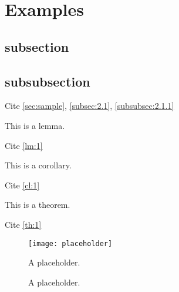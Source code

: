 

\newpage

\section{Examples}
\label{sec:sample}

\subsection{subsection}
\label{subsec:2.1}
\subsection{subsubsection}
\label{subsubsec:2.1.1}

Cite \autoref{sec:sample}, \autoref{subsec:2.1}, \autoref{subsubsec:2.1.1}

\begin{lemma}\label{lm:1}
This is a lemma.
\end{lemma}
Cite \autoref{lm:1}

\begin{corollary}\label{cl:1}
This is a corollary.
\end{corollary}
Cite \autoref{cl:1}

\begin{theorem}\label{th:1}
This is a theorem.
\end{theorem}
Cite \autoref{th:1}

\begin{figure}[!htb]
  \begin{center}
      \texttt{[image: placeholder]}
      \caption{A placeholder.}\label{fig:placeholder0}
  \end{center}
\end{figure}

\begin{figure}[!htb]
  \begin{center}
      \caption{A placeholder.}\label{fig:placeholder1}
  \end{center}
\end{figure}

